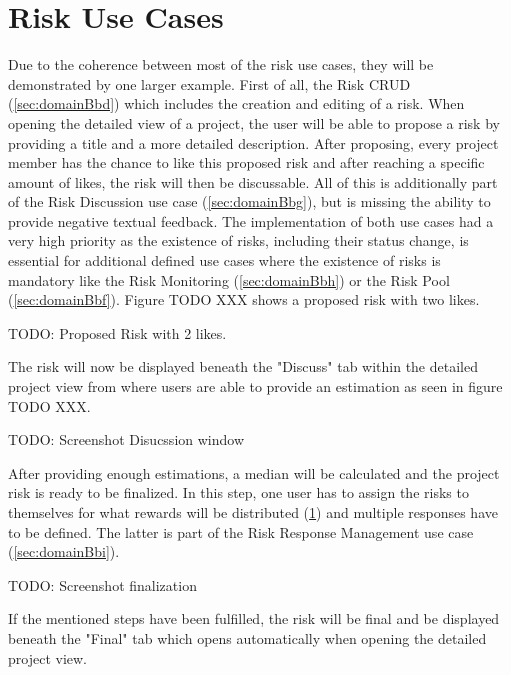 
\section{Risk Use Cases}
\label{sec:implementationRisks}

Due to the coherence between most of the risk use cases, they will be demonstrated by one larger example. First of all, the Risk CRUD (\ref{sec:domainBbd}) which includes the creation and editing of a risk.  When opening the detailed view of a project, the user will be able to propose a risk by providing a title and a more detailed description. After proposing, every project member has the chance to like this proposed risk and after reaching a specific amount of likes, the risk will then be discussable. All of this is additionally part of the Risk Discussion use case (\ref{sec:domainBbg}), but is missing the ability to provide negative textual feedback. The implementation of both use cases had a very high priority as the existence of risks, including their status change, is essential for additional defined use cases where the existence of risks is mandatory like the Risk Monitoring (\ref{sec:domainBbh}) or the Risk Pool (\ref{sec:domainBbf}). Figure TODO XXX shows a proposed risk with two likes.

TODO: Proposed Risk with 2 likes.

The risk will now be displayed beneath the "Discuss" tab within the detailed project view from where users are able to provide an estimation as seen in figure TODO XXX.

TODO: Screenshot Disucssion window

After providing enough estimations, a median will be calculated and the project risk is ready to be finalized. In this step, one user has to assign the risks to themselves for what rewards will be distributed (\ref{sec:implementationRisks}) and multiple responses have to be defined. The latter is part of the Risk Response Management use case (\ref{sec:domainBbi}).

TODO: Screenshot finalization

If the mentioned steps have been fulfilled, the risk will be final and be displayed beneath the "Final" tab which opens automatically when opening the detailed project view.

